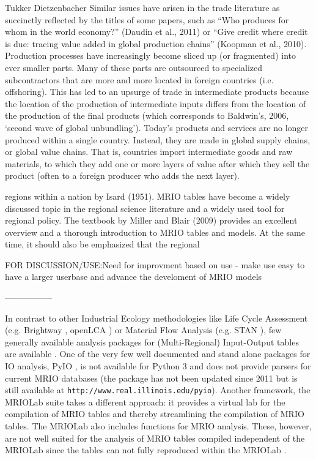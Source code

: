 \documentclass{jors}
\begin{document}
{Tukker Dietzenbacher
Similar issues have arisen in the trade literature as succinctly reflected by the titles of some
papers, such as “Who produces for whom in the world economy?” (Daudin et al., 2011) or
“Give credit where credit is due: tracing value added in global production chains” (Koopman
et al., 2010). Production processes have increasingly become sliced up (or fragmented) into
ever smaller parts. Many of these parts are outsourced to specialized subcontractors that
are more and more located in foreign countries (i.e. offshoring). This has led to an upsurge
of trade in intermediate products because the location of the production of intermediate
inputs differs from the location of the production of the final products (which corresponds
to Baldwin’s, 2006, ‘second wave of global unbundling’). Today’s products and services are
no longer produced within a single country. Instead, they are made in global supply chains,
or global value chains. That is, countries import intermediate goods and raw materials, to
which they add one or more layers of value after which they sell the product (often to a
foreign producer who adds the next layer).

regions within a nation by Isard (1951). MRIO tables have become a widely discussed topic
in the regional science literature and a widely used tool for regional policy. The textbook
by Miller and Blair (2009) provides an excellent overview and a thorough introduction to
MRIO tables and models. At the same time, it should also be emphasized that the regional

FOR DISCUSSION/USE:Need for improvment based on use - make use easy to have a larger userbase and advance the develoment of MRIO models

-----------------

In contrast to other Industrial Ecology methodologies like 
Life Cycle Assessment (e.g. Brightway \cite{mutel2017_Brightway}, openLCA \cite{openlca2018_openLCA})
or Material Flow Analysis (e.g. STAN \cite{cencic2008_Material}), 
few generally available analysis packages for (Multi-Regional) Input-Output tables are available \cite{pauliuk2015_Lifting}. One of the very few well documented and stand alone packages for IO analysis, PyIO \cite{nazara2003_PyIO}, is not available for Python 3 and does not provide parsers for current MRIO databases (the package has not been updated since 2011 but is still available at \texttt{http://www.real.illinois.edu/pyio}). Another framework, the MRIOLab suite \cite{lenzen2017_Global, geschke2017_Virtual} takes a different approach: it provides a virtual lab for the compilation of MRIO tables and thereby streamlining the compilation of MRIO tables. The MRIOLab also includes functions for MRIO analysis. These, however, are not well suited for the analysis of MRIO tables compiled independent of the MRIOLab since the tables can not fully reproduced within the MRIOLab \cite{reyes2017_Virtual, rahman2017_flexible}.

}
\end{document}
